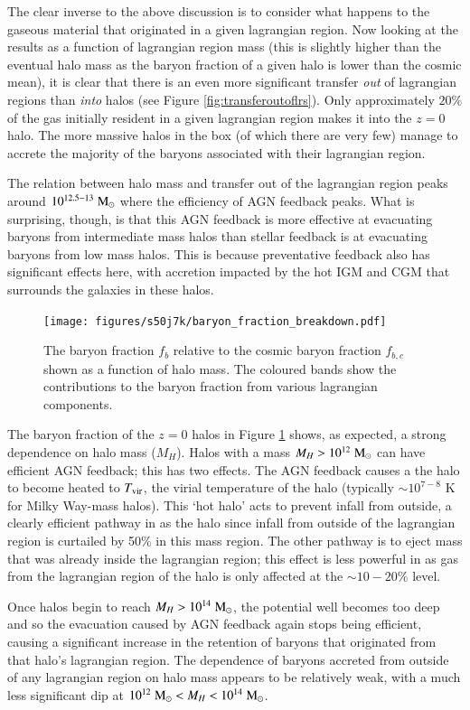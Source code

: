 The clear inverse to the above discussion is to consider what happens to the gaseous
material that originated in a given lagrangian region. Now looking at the results as
a function of lagrangian region mass (this is slightly higher than the eventual
halo mass as the baryon fraction of a given halo is lower than the cosmic mean), it
is clear that there is an even more significant transfer \emph{out} of lagrangian
regions than \emph{into} halos (see Figure \ref{fig:transferoutoflrs}). Only 
approximately $20\%$ of the gas initially resident in a given lagrangian region
makes it into the $z=0$ halo. The more massive halos in the box (of which there 
are very few) manage to accrete the majority of the baryons associated with their
lagrangian region.

The relation between halo mass and transfer out of the lagrangian region peaks
around $10^{12.5-13}\;{\rm M}_{\odot}{}$ where the efficiency of AGN feedback peaks. What
is surprising, though, is that this AGN feedback is more effective at evacuating
baryons from intermediate mass halos than stellar feedback is at evacuating
baryons from low mass halos. This is because preventative feedback also has
significant effects here, with accretion impacted by the hot IGM and CGM that
surrounds the galaxies in these halos.

\begin{figure}
	\centering
	\texttt{[image: figures/s50j7k/baryon\_fraction\_breakdown.pdf]}
	\vspace{-0.7cm}
	\caption{The baryon fraction $f_b$ relative to the cosmic baryon fraction
	$f_{b, c}$ shown as a function of halo mass. The coloured bands show the
	contributions to the baryon fraction from various lagrangian components.}
	\label{fig:baryonfraction}
\end{figure}

The baryon fraction of the $z=0$ halos in Figure \ref{fig:baryonfraction}
shows, as expected, a strong dependence on halo mass ($M_H$). Halos with a
mass  $M_H > 10^{12} \;{\rm M}_{\odot}{}$ can have efficient AGN feedback; this has two
effects. The AGN feedback causes a the halo to become heated to $T_{\rm
vir}$, the virial temperature of the halo (typically $\sim10^{7-8}$ K for Milky
Way-mass halos). This `hot halo' acts to prevent infall from outside, a
clearly efficient pathway in \simba{} as the halo since infall from outside of
the lagrangian region is curtailed by 50\% in this mass region.  The other
pathway is to eject mass that was already inside the lagrangian region; this
effect is less powerful in \simba{} as gas from the lagrangian region of the
halo is only affected at the $\sim10-20\%$ level.

Once halos begin to reach $M_H > 10^{14} \;{\rm M}_{\odot}{}$, the potential well
becomes too deep and so the evacuation caused by AGN feedback again stops
being efficient, causing a significant increase in the retention of baryons
that originated from that halo's lagrangian region. The dependence of baryons
accreted from outside of any lagrangian region on halo mass appears to be
relatively weak, with a much less significant dip at $10^{12} \;{\rm M}_{\odot}{} < M_H
< 10^{14} \;{\rm M}_{\odot}{}$.
